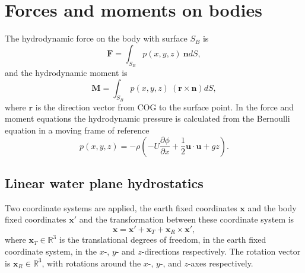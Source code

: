 \documentclass[]{book}
\newcommand{\V}[1]{\boldsymbol{#1}}
\newcommand{\D}[2]{\frac{\partial #1}{\partial #2}}
\begin{document}
\section{Forces and moments on bodies}
The hydrodynamic force on the body with surface $S_B$ is
\begin{equation}
	\V{F} = \int_{S_B} p(x, y, z) ~\V{n} dS, 
\end{equation}
and the hydrodynamic moment is
\begin{equation}
\V{M} = \int_{S_B} p(x, y, z) ~ (\V{r} \times \V{n}) dS,
\end{equation}
where $\V{r}$ is the direction vector from COG to the surface point. In the force and moment equations the hydrodynamic pressure is calculated from the Bernoulli equation in a moving frame of reference
\begin{equation}
	p(x, y, z) = -\rho \left( -U \D{\phi}{x} + \frac{1}{2} \V{u} \cdot \V{u} + gz \right).
\end{equation}

\subsection{Linear water plane hydrostatics}

Two coordinate systems are applied, the earth fixed coordinates $\V{x}$ and the body fixed coordinates $\V{x}'$ and the transformation between these coordinate system is
\begin{equation}
	\V{x} = \V{x}' + \V{x}_T +  \V{x}_R \times \V{x}',
\end{equation}
where $\V{x}_T \in \mathbb{R}^3$ is the translational degrees of freedom, in the earth fixed coordinate system, in the $x$-, $y$- and $z$-directions respectively. The rotation vector is $\V{x}_R \in \mathbb{R}^3$, with rotations around the $x$-, $y$-, and $z$-axes respectively.
\end{document}
